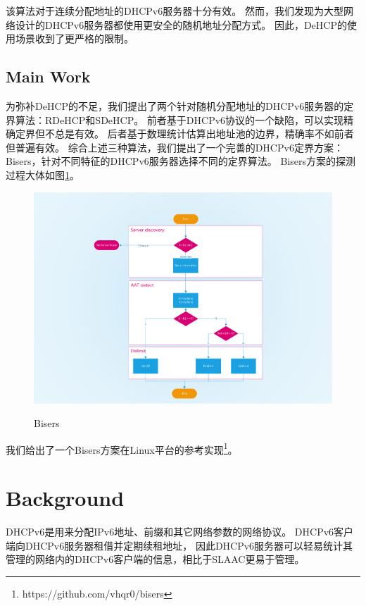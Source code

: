 \documentclass[UTF8]{article}
\begin{document}
该算法对于连续分配地址的DHCPv6服务器十分有效。
然而，我们发现为大型网络设计的DHCPv6服务器都使用更安全的随机地址分配方式。
因此，DeHCP的使用场景收到了更严格的限制。

\subsection{Main Work}

为弥补DeHCP的不足，我们提出了两个针对随机分配地址的DHCPv6服务器的定界算法：RDeHCP和SDeHCP。
前者基于DHCPv6协议的一个缺陷，可以实现精确定界但不总是有效。
后者基于数理统计估算出地址池的边界，精确率不如前者但普遍有效。
综合上述三种算法，我们提出了一个完善的DHCPv6定界方案：Bisers，针对不同特征的DHCPv6服务器选择不同的定界算法。
Bisers方案的探测过程大体如图\ref{figBisers}。

\begin{figure}[htbp]
  \caption{Bisers}
  \label{figBisers}
  \centering
  \includegraphics[scale=0.3]{bisers.pdf} \\
\end{figure}

我们给出了一个Bisers方案在Linux平台的参考实现\footnote{https://github.com/vhqr0/bisers}。

\section{Background}

DHCPv6是用来分配IPv6地址、前缀和其它网络参数的网络协议。
DHCPv6客户端向DHCPv6服务器租借并定期续租地址，
因此DHCPv6服务器可以轻易统计其管理的网络内的DHCPv6客户端的信息，相比于SLAAC更易于管理。
\end{document}
